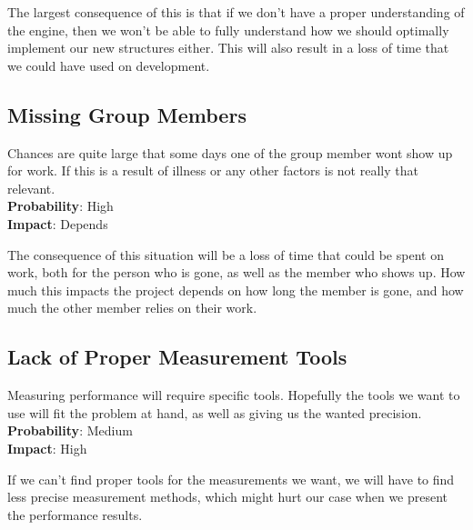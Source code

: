 The largest consequence of this is that if we don't have a proper understanding of the engine,
then we won't be able to fully understand how we should optimally implement our new structures either.
This will also result in a loss of time that we could have used on development.

\subsection*{Missing Group Members}
Chances are quite large that some days one of the group member wont show up for work.
If this is a result of illness or any other factors is not really that relevant.\\
\textbf{Probability}: High\\
\textbf{Impact}: Depends

The consequence of this situation will be a loss of time that could be spent on work, 
both for the person who is gone, as well as the member who shows up.
How much this impacts the project depends on how long the member is gone,
and how much the other member relies on their work.

\subsection*{Lack of Proper Measurement Tools}
Measuring performance will require specific tools. 
Hopefully the tools we want to use will fit the problem at hand, 
as well as giving us the wanted precision.\\
\textbf{Probability}: Medium\\
\textbf{Impact}: High

If we can't find proper tools for the measurements we want,
we will have to find less precise measurement methods,
which might hurt our case when we present the performance results.